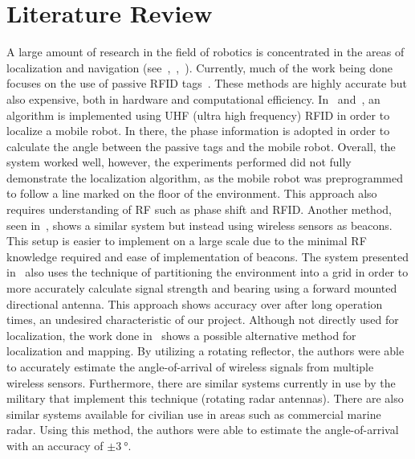 \documentclass[letterpaper,12pt]{article}   %
\begin{document}
\section{Literature Review} %

A large amount of research in the field of robotics is concentrated in the areas of localization and navigation (see~\cite{Martinelli2015},~\cite{DiGiampaolo2014},~\cite{Song2012}). Currently, much of the work being done focuses on the use of passive RFID tags~\cite{Martinelli2015}\cite{DiGiampaolo2014}. These methods are highly accurate but also expensive, both in hardware and computational efficiency. In~\cite{Martinelli2015} and~\cite{DiGiampaolo2014}, an algorithm is implemented using UHF (ultra high frequency) RFID in order to localize a mobile robot. In there, the phase information is adopted in order to calculate the angle between the passive tags and the mobile robot. Overall, the system worked well, however, the experiments performed did not fully demonstrate the localization algorithm, as the mobile robot was preprogrammed to follow a line marked on the floor of the environment. This approach also requires understanding of RF such as phase shift and RFID. Another method, seen in~\cite{Song2012}, shows a similar system but instead using wireless sensors as beacons. This setup is easier to implement on a large scale due to the minimal RF knowledge required and ease of implementation of beacons. The system presented in~\cite{Song2012} also uses the technique of partitioning the environment into a grid in order to more accurately calculate signal strength and bearing using a forward mounted directional antenna. This approach shows accuracy over after long operation times, an undesired characteristic of our project. Although not directly used for localization, the work done in~\cite{Hood2011} shows a possible alternative method for localization and mapping. By utilizing a rotating reflector, the authors were able to accurately estimate the angle-of-arrival of wireless signals from multiple wireless sensors. Furthermore, there are similar systems currently in use by the military that implement this technique (rotating radar antennas). There are also similar systems available for civilian use in areas such as commercial marine radar. Using this method, the authors were able to estimate the angle-of-arrival with an accuracy of $\pm \SI{3}{\degree}$.\\
\end{document}
